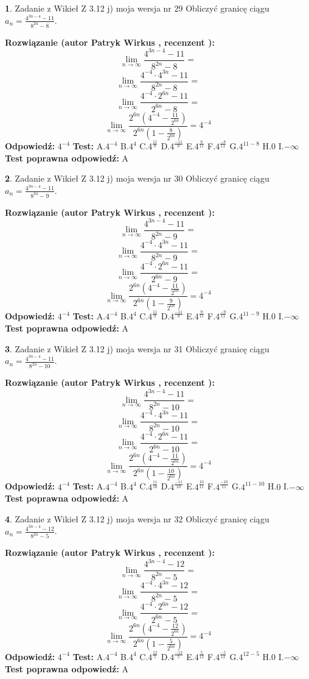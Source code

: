 \documentclass[12pt, a4paper]{article}
\theoremstyle{definition} %
\newtheorem{zad}{}
\newcommand{\zadStart}[1]{\begin{zad}#1\newline}
\newcommand{\zadStop}{\end{zad}}
\newcommand{\rozwStart}[2]{\noindent \textbf{Rozwiązanie (autor #1 , recenzent #2): }\newline}
\newcommand{\rozwStop}{\newline}
\newcommand{\odpStart}{\noindent \textbf{Odpowiedź:}\newline}
\newcommand{\odpStop}{\newline}
\newcommand{\testStart}{\noindent \textbf{Test:}\newline}
\newcommand{\testStop}{\newline}
\newcommand{\kluczStart}{\noindent \textbf{Test poprawna odpowiedź:}\newline}
\newcommand{\kluczStop}{\newline}
\begin{document}
\zadStart{Zadanie z Wikieł Z 3.12 j) moja wersja nr 29}
Obliczyć granicę ciągu $a_{n}=\frac{4^{3n-4}-11}{8^{2n}-8}$.
\zadStop
\rozwStart{Patryk Wirkus}{}
$$\lim\limits_{n\to\infty}\frac{4^{3n-4}-11}{8^{2n}-8}=$$
$$\lim\limits_{n\to\infty}\frac{4^{-4} \cdot 4^{3n}-11}{8^{2n}-8}=$$
$$\lim\limits_{n\to\infty}\frac{4^{-4} \cdot 2^{6n}-11}{2^{6n}-8}=$$
$$\lim\limits_{n\to\infty}\frac{2^{6n}(4^{-4} - \frac{11}{2^{6n}})}{2^{6n}(1-\frac{8}{2^{6n}})}= 4^{-4}$$
\rozwStop
\odpStart
$4^{-4}$
\odpStop
\testStart
A.$4^{-4}$
B.$4^{4}$
C.$4^{\frac{11}{8}}$
D.$4^{\frac{-11}{8}}$
E.$4^{\frac{8}{11}}$
F.$4^{\frac{-8}{11}}$
G.$4^{11-8}$
H.$0$
I.$-\infty$
\testStop
\kluczStart
A
\kluczStop



\zadStart{Zadanie z Wikieł Z 3.12 j) moja wersja nr 30}
Obliczyć granicę ciągu $a_{n}=\frac{4^{3n-4}-11}{8^{2n}-9}$.
\zadStop
\rozwStart{Patryk Wirkus}{}
$$\lim\limits_{n\to\infty}\frac{4^{3n-4}-11}{8^{2n}-9}=$$
$$\lim\limits_{n\to\infty}\frac{4^{-4} \cdot 4^{3n}-11}{8^{2n}-9}=$$
$$\lim\limits_{n\to\infty}\frac{4^{-4} \cdot 2^{6n}-11}{2^{6n}-9}=$$
$$\lim\limits_{n\to\infty}\frac{2^{6n}(4^{-4} - \frac{11}{2^{6n}})}{2^{6n}(1-\frac{9}{2^{6n}})}= 4^{-4}$$
\rozwStop
\odpStart
$4^{-4}$
\odpStop
\testStart
A.$4^{-4}$
B.$4^{4}$
C.$4^{\frac{11}{9}}$
D.$4^{\frac{-11}{9}}$
E.$4^{\frac{9}{11}}$
F.$4^{\frac{-9}{11}}$
G.$4^{11-9}$
H.$0$
I.$-\infty$
\testStop
\kluczStart
A
\kluczStop



\zadStart{Zadanie z Wikieł Z 3.12 j) moja wersja nr 31}
Obliczyć granicę ciągu $a_{n}=\frac{4^{3n-4}-11}{8^{2n}-10}$.
\zadStop
\rozwStart{Patryk Wirkus}{}
$$\lim\limits_{n\to\infty}\frac{4^{3n-4}-11}{8^{2n}-10}=$$
$$\lim\limits_{n\to\infty}\frac{4^{-4} \cdot 4^{3n}-11}{8^{2n}-10}=$$
$$\lim\limits_{n\to\infty}\frac{4^{-4} \cdot 2^{6n}-11}{2^{6n}-10}=$$
$$\lim\limits_{n\to\infty}\frac{2^{6n}(4^{-4} - \frac{11}{2^{6n}})}{2^{6n}(1-\frac{10}{2^{6n}})}= 4^{-4}$$
\rozwStop
\odpStart
$4^{-4}$
\odpStop
\testStart
A.$4^{-4}$
B.$4^{4}$
C.$4^{\frac{11}{10}}$
D.$4^{\frac{-11}{10}}$
E.$4^{\frac{10}{11}}$
F.$4^{\frac{-10}{11}}$
G.$4^{11-10}$
H.$0$
I.$-\infty$
\testStop
\kluczStart
A
\kluczStop



\zadStart{Zadanie z Wikieł Z 3.12 j) moja wersja nr 32}
Obliczyć granicę ciągu $a_{n}=\frac{4^{3n-4}-12}{8^{2n}-5}$.
\zadStop
\rozwStart{Patryk Wirkus}{}
$$\lim\limits_{n\to\infty}\frac{4^{3n-4}-12}{8^{2n}-5}=$$
$$\lim\limits_{n\to\infty}\frac{4^{-4} \cdot 4^{3n}-12}{8^{2n}-5}=$$
$$\lim\limits_{n\to\infty}\frac{4^{-4} \cdot 2^{6n}-12}{2^{6n}-5}=$$
$$\lim\limits_{n\to\infty}\frac{2^{6n}(4^{-4} - \frac{12}{2^{6n}})}{2^{6n}(1-\frac{5}{2^{6n}})}= 4^{-4}$$
\rozwStop
\odpStart
$4^{-4}$
\odpStop
\testStart
A.$4^{-4}$
B.$4^{4}$
C.$4^{\frac{12}{5}}$
D.$4^{\frac{-12}{5}}$
E.$4^{\frac{5}{12}}$
F.$4^{\frac{-5}{12}}$
G.$4^{12-5}$
H.$0$
I.$-\infty$
\testStop
\kluczStart
A
\kluczStop
\end{document}
